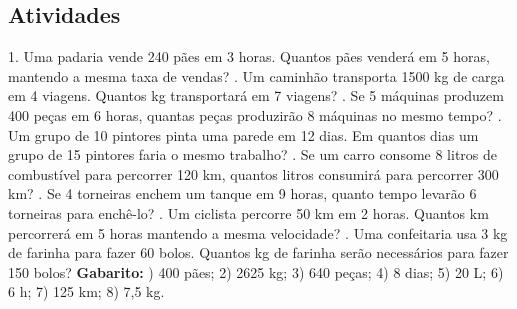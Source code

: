 \documentclass[a4paper,12pt]{article}
\begin{document}
\subsection*{Atividades}

1. Uma padaria vende 240 pães em 3 horas. Quantos pães venderá em 5 horas, mantendo a mesma taxa de vendas? . Um caminhão transporta 1500 kg de carga em 4 viagens. Quantos kg transportará em 7 viagens? . Se 5 máquinas produzem 400 peças em 6 horas, quantas peças produzirão 8 máquinas no mesmo tempo? . Um grupo de 10 pintores pinta uma parede em 12 dias. Em quantos dias um grupo de 15 pintores faria o mesmo trabalho? . Se um carro consome 8 litros de combustível para percorrer 120 km, quantos litros consumirá para percorrer 300 km? . Se 4 torneiras enchem um tanque em 9 horas, quanto tempo levarão 6 torneiras para enchê-lo? . Um ciclista percorre 50 km em 2 horas. Quantos km percorrerá em 5 horas mantendo a mesma velocidade? . Uma confeitaria usa 3 kg de farinha para fazer 60 bolos. Quantos kg de farinha serão necessários para fazer 150 bolos? \newline
 \newline
\textbf{Gabarito:} ) 400 pães; 2) 2625 kg; 3) 640 peças; 4) 8 dias; 5) 20 L; 6) 6 h; 7) 125 km; 8) 7,5 kg. \newline
\end{document}
